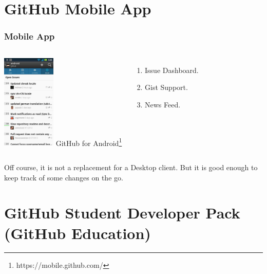 \section[Mobile App]{GitHub Mobile App}

\begin{frame}
    \frametitle{Mobile App}
\begin{columns}[c]
\column{2in}
	\centering
	\includegraphics[width=1in]{img/mobile.jpg} 
\column{2in}
GitHub for Android\footnote{https://mobile.github.com/}
\begin{enumerate}
\item Issue Dashboard.
\item Gist Support.
\item News Feed.
\end{enumerate}
\end{columns}
\vspace{5mm}
{\small Off course, it is not a replacement for a Desktop client. But it is good enough to keep track of some changes on the go.}
\end{frame}


\section[GitHub Education]{GitHub Student Developer Pack (GitHub Education)}


